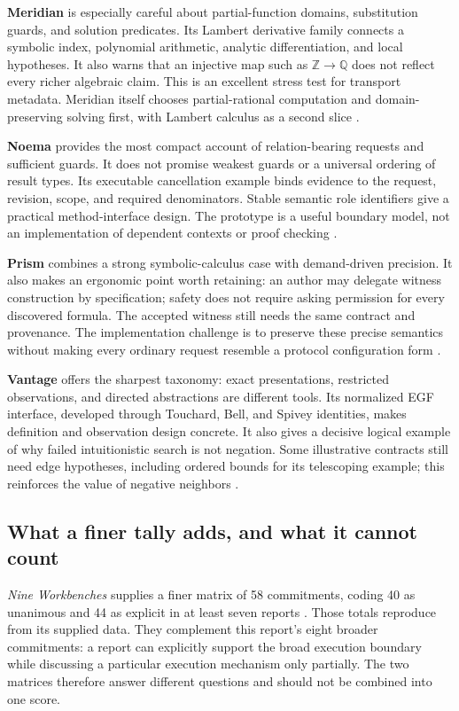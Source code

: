 \documentclass[11pt,letterpaper]{article}
\newcommand{\Z}{\mathbb Z}
\newcommand{\Q}{\mathbb Q}
\begin{document}
\textbf{Meridian} is especially careful about partial-function domains,
substitution guards, and solution predicates. Its Lambert derivative family
connects a symbolic index, polynomial arithmetic, analytic differentiation, and
local hypotheses. It also warns that an injective map such as \(\Z\to\Q\)
does not reflect every richer algebraic claim. This is an excellent stress test
for transport metadata. Meridian itself chooses partial-rational computation
and domain-preserving solving first, with Lambert calculus as a second slice
\cite[\S\S4--9,12--16]{meridian}.

\textbf{Noema} provides the most compact account of relation-bearing requests
and sufficient guards. It does not promise weakest guards or a universal
ordering of result types. Its executable cancellation example binds evidence to
the request, revision, scope, and required denominators. Stable semantic role
identifiers give a practical method-interface design. The prototype is a useful
boundary model, not an implementation of dependent contexts or proof checking
\cite[\S\S4--8,10--12]{noema}.

\textbf{Prism} combines a strong symbolic-calculus case with demand-driven
precision. It also makes an ergonomic point worth retaining: an author may
delegate witness construction by specification; safety does not require asking
permission for every discovered formula. The accepted witness still needs the
same contract and provenance. The implementation challenge is to preserve these
precise semantics without making every ordinary request resemble a protocol
configuration form \cite[\S\S5--7,9--11,13--18]{prism}.

\textbf{Vantage} offers the sharpest taxonomy: exact presentations, restricted
observations, and directed abstractions are different tools. Its normalized EGF
interface, developed through Touchard, Bell, and Spivey identities, makes
definition and observation design concrete. It also gives a decisive logical
example of why failed intuitionistic search is not negation. Some illustrative
contracts still need edge hypotheses, including ordered bounds for its
telescoping example; this reinforces the value of negative neighbors
\cite[\S\S3,5,9--15]{vantage}.

\subsection{What a finer tally adds, and what it cannot count}
\emph{Nine Workbenches} supplies a finer matrix of 58 commitments, coding 40 as
unanimous and 44 as explicit in at least seven reports \cite[\S4]{secondary}.
Those totals reproduce from its supplied data. They complement this report's
eight broader commitments: a report can explicitly support the broad execution
boundary while discussing a particular execution mechanism only partially.
The two matrices therefore answer different questions and should not be
combined into one score.
\end{document}
